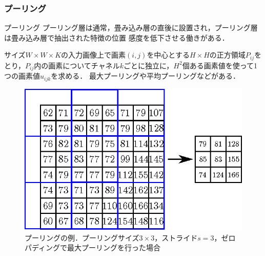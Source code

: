 \documentclass[dvipdfmx,11pt,notheorems]{beamer}
\theoremstyle{definition}
\begin{document}




\begin{frame}[fragile]\frametitle{プーリング}
\begin{block}{プーリング}
プーリング層は通常，畳み込み層の直後に設置され，プーリング層は畳み込み層で抽出された特徴の位置
感度を低下させる働きがある．
\end{block}
サイズ$W \times W \times K$の入力画像上で画素$(i,j)$を中心とする$H\times H$の正方領域$P_{ij}$をとり，$P_{ij}$内の画素についてチャネル$k$ごとに独立に，$H^2$個ある画素値を使って1つの画素値$u_{ijk}$を求める． 最大プーリングや平均プーリングなどがある．
\begin{figure}[bt]
 \centering
 \includegraphics[scale = 0.6]{fig/eps/pooling.eps}
 \caption{プーリングの例．プーリングサイズ$3\times 3$，ストライド$s=3$，ゼロパディングで最大プーリングを行った場合}
\end{figure}
\end{frame}
\end{document}
